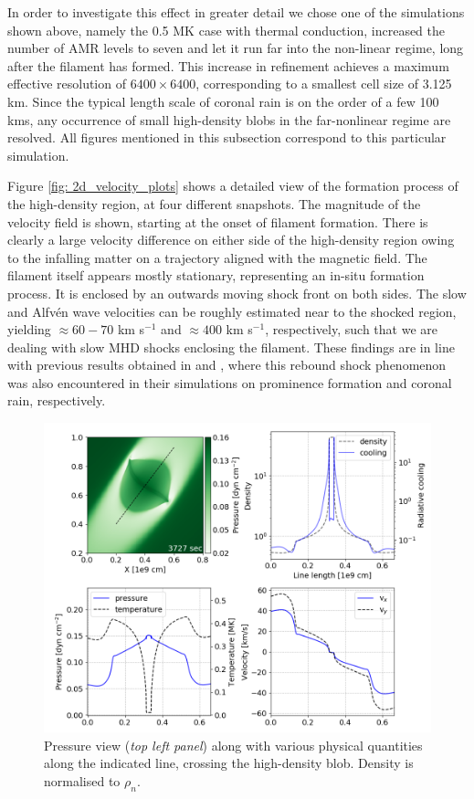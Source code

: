 In order to investigate this effect in greater detail we chose one of the simulations shown above, namely the 0.5 MK case with thermal conduction, increased the number of AMR levels to seven and let it run far into the non-linear regime, long after the filament has formed. This increase in refinement achieves a maximum effective resolution of $6400 \times 6400$, corresponding to a smallest cell size of 3.125 km. Since the typical length scale of coronal rain is on the order of a few 100 kms, any occurrence of small high-density blobs in the far-nonlinear regime are resolved. All figures mentioned in this subsection correspond to this particular simulation.



Figure \ref{fig: 2d_velocity_plots} shows a detailed view of the formation process of the high-density region, at four different snapshots. The magnitude of the velocity field is shown, starting at the onset of filament formation. There is clearly a large velocity difference on either side of the high-density region owing to the infalling matter on a trajectory aligned with the magnetic field. The filament itself appears mostly stationary, representing an in-situ formation process. It is enclosed by an outwards moving shock front on both sides. The slow and Alfv\'en wave velocities can be roughly estimated near to the shocked region, yielding $\approx 60-70$ km s$^{-1}$ and $\approx 400$ km s$^{-1}$, respectively, such that we are dealing with slow MHD shocks enclosing the filament. These findings are in line with previous results obtained in \citet{xia2012} and \citet{fang2015}, where this rebound shock phenomenon was also encountered in their simulations on prominence formation and coronal rain, respectively.

\begin{figure}[t]
  \centering
  \includegraphics[width=\textwidth]{2d_lineplots.png}
  \caption{
    Pressure view (\emph{top left panel}) along with various physical quantities along the indicated line, crossing the high-density blob. Density is normalised to $\rho_n$.
  }
  \label{fig: 2d_lineplots}
\end{figure}

